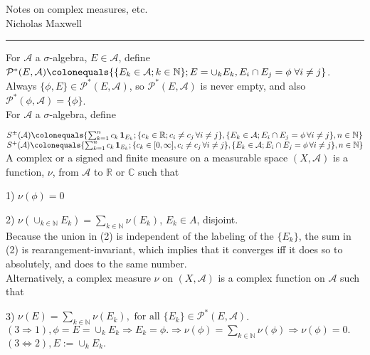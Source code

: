 \documentclass[12pt]{article}
\newcommand{\partset}[1]{ \mathcal{P}^{*}(#1) }
\newcommand{\fall}[0] { \textrm{ for all } }
\newcommand{\nats}[0] { \mathbb{N}}
\newcommand{\reals}[0] { \mathbb{R}}
\newcommand{\cmplxs}[0] { \mathbb{C}}
\newcommand{\A}[0] { \mathcal{A} }
\newcommand{\rimply}[0] { \Rightarrow }
\newcommand{\lrimply}[0] { \Leftrightarrow }
\newcommand{ \defeq }[0] { \colonequals }
\newcommand{ \cf }[1] { \mathbf{1}_{#1} }
\begin{document}
\begin{flushleft}
Notes on complex measures, etc. \\
Nicholas Maxwell\\
\end{flushleft}

\begin{flushleft}
\addvspace{5pt} \hrule
\end{flushleft}	

For $\A$ a $\sigma$-algebra, $E \in \A$, define $\partset{E, \A} \defeq \{ \{ E_k \in \A; k \in \nats \}; E = \cup_k E_k, E_i \cap E_j = \phi \;  \forall i \not = j \}$. Always $ \{ \phi, E \} \in \partset{E, \A}$, so $\partset{E, \A}$ is never empty, and also $\partset{\phi, \A} = \{ \phi \}$.    \\

For $\A$ a $\sigma$-algebra, define 


\noindent
$S^\pm(\A) \defeq \{ \sum_{k=1}^n c_k \, \cf{E_k}; \{c_k \in\reals; c_i \not = c_j \, \forall i \not = j\}, \{E_k \in \A; E_i \cap E_j = \phi \, \forall i \not = j \}, n \in \nats \}$ \\
\noindent
$S^{+}(\A) \defeq \{ \sum_{k=1}^n c_k \, \cf{E_k}; \{c_k \in [0, \infty], c_i \not = c_j \, \forall i \not = j\}, \{E_k \in \A; E_i \cap E_j = \phi \, \forall i \not = j \}, n \in \nats \}$ \\



A complex or a signed and finite measure on a measurable space $(X,\A)$ is a function, $\nu$, from $\A$ to $\reals$ or $\cmplxs$ such that

1) $\nu(\phi) = 0$

2) $\nu( \cup_{k\in \nats} E_k ) = \sum_{k \in \nats} \nu(E_k) $, $E_k \in A$, disjoint.  \\

Because the union in (2) is independent of the labeling of the $\{ E_k \}$, the sum in (2) is rearangement-invariant, which implies that it converges iff it does so to absolutely, and does to the same number. \\

Alternatively, a complex measure $\nu$ on $(X,\A)$ is a complex function on $\A$ such that

3) $\nu(E) = \sum_{k \in \nats} \nu(E_k), \fall \{ E_k\} \in \partset{E, \A}$.\\

$(3 \rimply 1), \phi = E = \cup_k E_k \rimply E_k = \phi. \rimply \nu(\phi) = \sum_{k \in \nats } \nu(\phi) \rimply \nu(\phi) = 0.$ $(3 \lrimply 2), E := \cup_k E_k.$ \\
\end{document}
